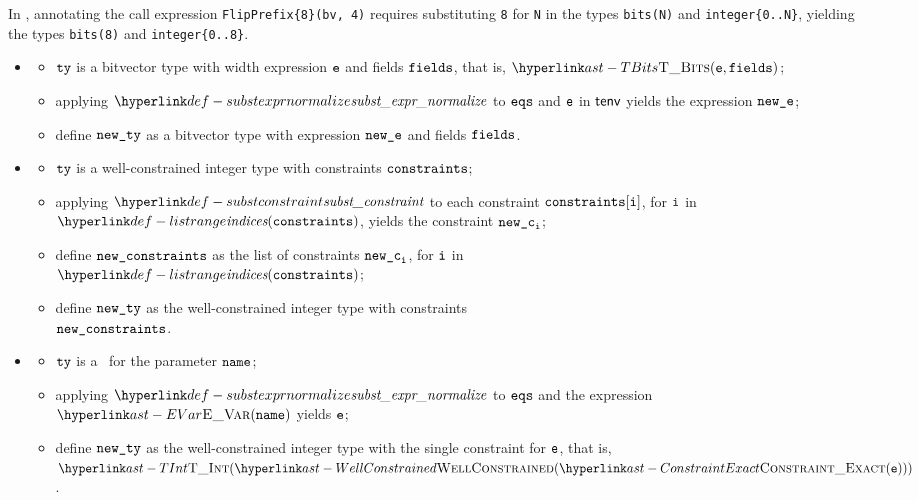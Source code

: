 In , annotating the call expression \verb|FlipPrefix{8}(bv, 4)|
requires substituting \verb|8| for \verb|N| in the types
\verb|bits(N)| and \verb|integer{0..N}|, yielding the types
\verb|bits(8)| and \verb|integer{0..8}|.

\ProseParagraph
\OneApplies
\begin{itemize}
  \item {}
  \begin{itemize}
    \item $\texttt{ty}$ is a bitvector type with width expression $\texttt{e}$ and fields $\texttt{fields}$, that is, $\TBits(\ve, \fields)$;
    \item applying $\substexprnormalize$ to $\texttt{eqs}$ and $\texttt{e}$ in $\textsf{tenv}$ yields the expression $\texttt{new\_e}$;
    \item define $\texttt{new\_ty}$ as a bitvector type with expression $\texttt{new\_e}$ and fields $\texttt{fields}$.
  \end{itemize}

  \item {}
  \begin{itemize}
    \item $\texttt{ty}$ is a well-constrained integer type with constraints $\texttt{constraints}$;
    \item applying $\substconstraint$ to each constraint $\texttt{constraints}[\texttt{i}]$, for $\texttt{i}$ in \\
          $\listrange(\constraints)$, yields the constraint $\texttt{new\_c}_{\texttt{i}}$;
    \item define $\texttt{new\_constraints}$ as the list of constraints $\texttt{new\_c}_{\texttt{i}}$, for $\texttt{i}$ in \\
          $\listrange(\constraints)$;
    \item define $\texttt{new\_ty}$ as the well-constrained integer type with constraints \\
          $\texttt{new\_constraints}$.
  \end{itemize}

  \item {}
  \begin{itemize}
    \item $\texttt{ty}$ is a \parameterizedintegertype\ for the parameter $\texttt{name}$;
    \item applying $\substexprnormalize$ to $\texttt{eqs}$ and the expression $\EVar(\name)$ yields $\texttt{e}$;
    \item define $\texttt{new\_ty}$ as the well-constrained integer type with the single constraint for $\texttt{e}$, that is,
          $\TInt(\WellConstrained(\ConstraintExact(\ve)))$.
  \end{itemize}


\end{itemize}
